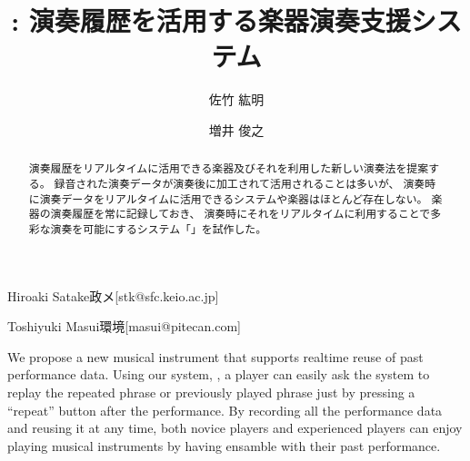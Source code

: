 \documentclass[submit,techreq]{ec2017}
\begin{document}
\title{{\system}: 演奏履歴を活用する楽器演奏支援システム}


  
\author{佐竹 紘明}{Hiroaki Satake}{政メ}[stk@sfc.keio.ac.jp]
\author{増井 俊之}{Toshiyuki Masui}{環境}[masui@pitecan.com]

\begin{abstract} %
  
  演奏履歴をリアルタイムに活用できる楽器及びそれを利用した新しい演奏法を提案する。
  録音された演奏データが演奏後に加工されて活用されることは多いが、
  演奏時に演奏データをリアルタイムに活用できるシステムや楽器はほとんど存在しない。
  楽器の演奏履歴を常に記録しておき、
  演奏時にそれをリアルタイムに利用することで多彩な演奏を可能にするシステム「{\system}」を試作した。
  
\end{abstract}


\begin{eabstract}

  We propose a new musical instrument that supports realtime reuse of
  past performance data.
  Using our system, \textit{\system},
  a player can easily ask the system to replay the repeated phrase or
  previously played phrase just by pressing a ``repeat'' button after the performance.
  By recording all the performance data and reusing it at any time,
  both novice players and experienced players can enjoy playing musical instruments
  by having ensamble with their past performance.
  
\end{eabstract}


\maketitle










\end{document}
